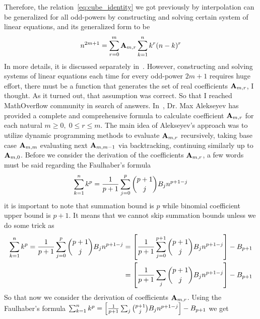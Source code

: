 Therefore, the relation~\eqref{eq:cube_identity} we got previously by interpolation can be generalized for
all odd-powers by constructing and solving certain system of linear equations, and its generalized form to be
\begin{equation*}
    n^{2m+1} = \sum_{r=0}^{m} {\mathbf{A}} \sb{m,r} \sum_{k=1}^{n} k^{r} (n-k)^{r}
\end{equation*}
In more details, it is discussed separately in~\cite{kolosov2022106}.
However, constructing and solving systems of linear equations each time for every odd-power $2m+1$ requires huge effort,
there must be a function that generates the set of real coefficients ${\mathbf{A}} \sb{m,r}$, I thought.
As it turned out, that assumption was correct.
So that I reached MathOverflow community in search of answers.
In~\cite{alekseyev2018mathoverflow}, Dr. Max Alekseyev has provided a complete and comprehensive formula to calculate
coefficient ${\mathbf{A}} \sb{m,r}$ for each natural $m\geq 0, \; 0 \leq r \leq m$.
The main idea of Alekseyev's approach was to utilize dynamic programming methods to evaluate ${\mathbf{A}} \sb{m,r}$ recursively,
taking base case ${\mathbf{A}} \sb{m,m}$ evaluating next ${\mathbf{A}} \sb{m,m-1}$ via backtracking,
continuing similarly up to ${\mathbf{A}} \sb{m,0}$.
Before we consider the derivation of the coefficients ${\mathbf{A}} \sb{m,r}$,
a few words must be said regarding the Faulhaber's formula
\begin{equation*}
    \sum_{k=1}^{n} k^{p} = \frac{1}{p+1}\sum_{j=0}^{p} \binom{p+1}{j} {B}\sb{j} n^{p+1-j}
\end{equation*}
it is important to note that summation bound is $p$ while binomial coefficient upper bound is $p+1$.
It means that we cannot skip summation bounds unless we do some trick as
\begin{equation*}
    \begin{split}
        \sum_{k=1}^{n} k^{p}
        = \frac{1}{p+1}\sum_{j=0}^{p} \binom{p+1}{j} {B}\sb{j} n^{p+1-j}
        &= \left[ \frac{1}{p+1}\sum_{j=0}^{p+1} \binom{p+1}{j} {B}\sb{j} n^{p+1-j} \right] - {B}\sb{p+1} \\
        &= \left[ \frac{1}{p+1}\sum_{j} \binom{p+1}{j} {B}\sb{j} n^{p+1-j} \right] - {B}\sb{p+1}
    \end{split}
\end{equation*}
So that now we consider the derivation of coefficients ${\mathbf{A}} \sb{m,r}$.
Using the Faulhaber's formula
$\sum_{k=1}^{n} k^{p} = \left[ \frac{1}{p+1}\sum_{j} \binom{p+1}{j} {B}\sb{j} n^{p+1-j} \right] - {B}\sb{p+1}$
we get
